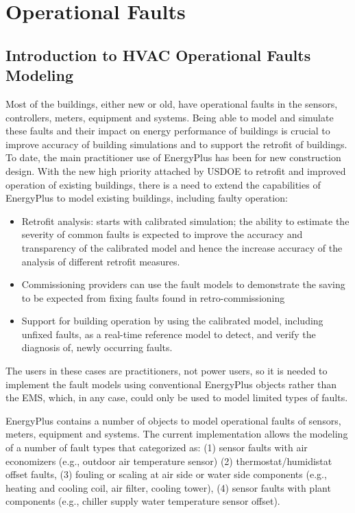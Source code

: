 \chapter{Operational Faults}\label{operational-faults}

\section{Introduction to HVAC Operational Faults Modeling}\label{introduction-to-hvac-operational-faults}

Most of the buildings, either new or old, have operational faults in the sensors, controllers, meters, equipment and systems. Being able to model and simulate these faults and their impact on energy performance of buildings is crucial to improve accuracy of building simulations and to support the retrofit of buildings. To date, the main practitioner use of EnergyPlus has been for new construction design. With the new high priority attached by USDOE to retrofit and improved operation of existing buildings, there is a need to extend the capabilities of EnergyPlus to model existing buildings, including faulty operation:

\begin{itemize}
\tightlist
\item
  Retrofit analysis: starts with calibrated simulation; the ability to estimate the severity of common faults is expected to improve the accuracy and transparency of the calibrated model and hence the increase accuracy of the analysis of different retrofit measures.\\
\item
  Commissioning providers can use the fault models to demonstrate the saving to be expected from fixing faults found in retro-commissioning
\item
  Support for building operation by using the calibrated model, including unfixed faults, as a real-time reference model to detect, and verify the diagnosis of, newly occurring faults.
\end{itemize}

The users in these cases are practitioners, not power users, so it is needed to implement the fault models using conventional EnergyPlus objects rather than the EMS, which, in any case, could only be used to model limited types of faults.

EnergyPlus contains a number of objects to model operational faults of sensors, meters, equipment and systems. The current implementation allows the modeling of a number of fault types that categorized as: (1) sensor faults with air economizers (e.g., outdoor air temperature sensor) (2) thermostat/humidistat offset faults, (3) fouling or scaling at air side or water side components (e.g., heating and cooling coil, air filter, cooling tower), (4) sensor faults with plant components (e.g., chiller supply water temperature sensor offset).


